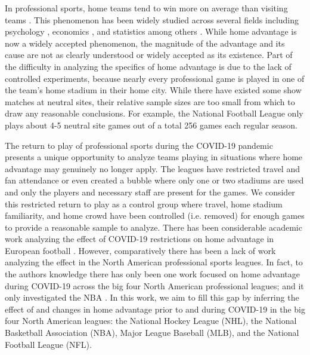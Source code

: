 In professional sports, home teams tend to win more on average than visiting teams \cite{Schwartz1977} \cite{Courneya1992} \cite{Nevill1999}. This phenomenon has been widely studied across several fields including psychology \cite{Agnew1994} \cite{Unkelbach2010}, economics \cite{Forrest2005} \cite{Dohmen2016}, and statistics \cite{Buraimo2010} \cite{Lopez2018} among others \cite{Benz2020}. While home advantage is now a widely accepted phenomenon, the magnitude of the advantage and its cause are not as clearly understood or widely accepted as its existence. Part of the difficulty in analyzing the specifics of home advantage is due to the lack of controlled experiments, because nearly every professional game is played in one of the team's home stadium in their home city. While there have existed some show matches at neutral sites, their relative sample sizes are too small from which to draw any reasonable conclusions. For example, the National Football League only plays about 4-5 neutral site games out of a total 256 games each regular season.

The return to play of professional sports during the COVID-19 pandemic presents a unique opportunity to analyze teams playing in situations where home advantage may genuinely no longer apply. The leagues have restricted travel and fan attendance or even created a bubble where only one or two stadiums are used and only the players and necessary staff are present for the games. We consider this restricted return to play as a control group where travel, home stadium familiarity, and home crowd have been controlled (i.e. removed) for enough games to provide a reasonable sample to analyze. There has been considerable academic work analyzing the effect of COVID-19 restrictions on home advantage in European football \cite{Benz2020}. However, comparatively there has been a lack of work analyzing the effect in the North American professional sports leagues. In fact, to the authors knowledge there has only been one work focused on home advantage during COVID-19 across the big four North American professional leagues; and it only investigated the NBA \cite{McHill2020}. In this work, we aim to fill this gap by inferring the effect of and changes in home advantage prior to and during COVID-19 in the big four North American leagues: the National Hockey League (NHL), the National Basketball Association (NBA), Major League Baseball (MLB), and the National Football League (NFL).

